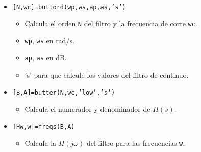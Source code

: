 \begin{frame}
\begin{itemize}
{{\begin{itemize}
\item \alert{\texttt{[N,wc]=buttord(wp,ws,ap,as,'s')}}
\begin{itemize}
\color{gray}
\item Calcula el orden \texttt{N} del filtro y la frecuencia de corte \texttt{wc}.
\item \texttt{wp}, \texttt{ws} en rad/s.
\item \texttt{ap}, \texttt{as} en dB.
\item 's' para que calcule los valores del filtro de continuo.
\end{itemize}
\item \alert{\texttt{[B,A]=butter(N,wc,'low','s')}}
\begin{itemize}
\color{gray}
\item Calcula el numerador y denominador de $H(s)$.
\end{itemize}
\item \alert{\texttt{[Hw,w]=freqs(B,A)}}
\begin{itemize}
\color{gray}
\item Calcula la $H(j\omega)$ del filtro para las frecuencias \texttt{w}.
\end{itemize}

\end{itemize}
}
}
\end{itemize}

\end{frame}


